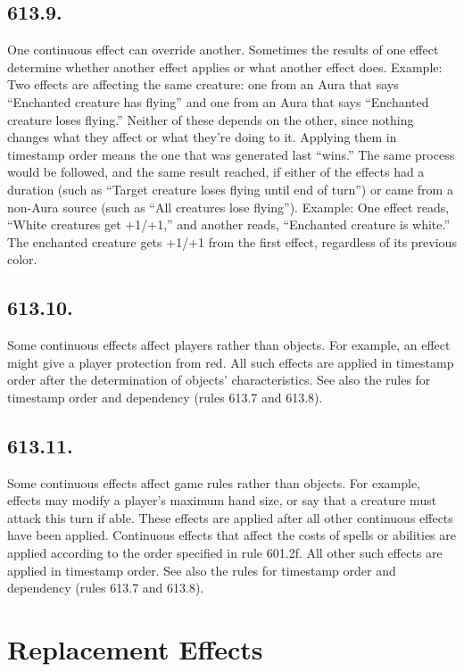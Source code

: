 \subsection*{613.9.}
One continuous effect can override another. Sometimes the results of one effect determine whether another effect applies or what another effect does.
Example: Two effects are affecting the same creature: one from an Aura that says “Enchanted creature has flying” and one from an Aura that says “Enchanted creature loses flying.” Neither of these depends on the other, since nothing changes what they affect or what they’re doing to it. Applying them in timestamp order means the one that was generated last “wins.” The same process would be followed, and the same result reached, if either of the effects had a duration (such as “Target creature loses flying until end of turn”) or came from a non-Aura source (such as “All creatures lose flying”).
Example: One effect reads, “White creatures get +1/+1,” and another reads, “Enchanted creature is white.” The enchanted creature gets +1/+1 from the first effect, regardless of its previous color.

\subsection*{613.10.}
Some continuous effects affect players rather than objects. For example, an effect might give a player protection from red. All such effects are applied in timestamp order after the determination of objects’ characteristics. See also the rules for timestamp order and dependency (rules 613.7 and 613.8).

\subsection*{613.11.}
Some continuous effects affect game rules rather than objects. For example, effects may modify a player’s maximum hand size, or say that a creature must attack this turn if able. These effects are applied after all other continuous effects have been applied. Continuous effects that affect the costs of spells or abilities are applied according to the order specified in rule 601.2f. All other such effects are applied in timestamp order. See also the rules for timestamp order and dependency (rules 613.7 and 613.8).

\section{Replacement Effects}
